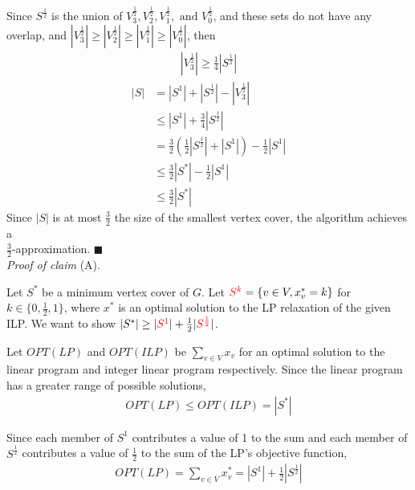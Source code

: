\documentclass{article}
\begin{document}
\begin{enumerate}
\begin{enumerate}
        Since $S^{\frac{1}{2}}$ is the union of $V_3^{\frac{1}{2}}, V_2^{\frac{1}{2}}, V_1^{\frac{1}{2}}, \text{ and } V_0^{\frac{1}{2}}$, and these sets do not have any overlap, and $|V_3^{\frac{1}{2}}| \geq |V_2^{\frac{1}{2}}| \geq |V_1^{\frac{1}{2}}| \geq |V_0^{\frac{1}{2}}|$, then 
        \begin{align*} 
            |V_3^{\frac{1}{2}}| \geq \frac{1}{4}|S^{\frac{1}{2}}| \tag{B}
        \end{align*}
        \begin{align*}
            |S|&=|S^1|+|S^{\frac{1}{2}}| - |V_3^{\frac{1}{2}}| \tag{by definition of $S$}\\
            & \leq |S^1| + \frac{3}{4}|S^{\frac{1}{2}}| \tag{by (B)}\\
            &= \frac{3}{2} (\frac{1}{2} |S^{\frac{1}{2}}| + |S^1|) - \frac{1}{2} |S^1|\\
            & \leq \frac{3}{2} |S^*| - \frac{1}{2} |S^1| \tag{by claim (A)}\\
            & \leq \frac{3}{2} |S^*|
        \end{align*}
        Since $|S|$ is at most $\frac{3}{2}$ the size of the smallest vertex cover, the algorithm achieves a \\ $\frac{3}{2}$-approximation. \hfill $\blacksquare$
        \\
        
        \emph{{\color{blue}Proof of claim}} {\color{blue}(A)}. 
        
        Let $S^*$ be a minimum vertex cover of $G$. Let ${\color{red}S^k}= \{v \in V, x^*_v=k\}$ for $k \in \{0, \frac{1}{2}, 1\}$, where $x^*$ is an optimal solution to the LP relaxation of the given ILP. We want to show $|S^*| \geq |{\color{red}S^1}| + \frac{1}{2}|{\color{red}S^{\frac{1}{2}}}|$. 
        
        Let $OPT(LP)$ and $OPT(ILP)$ be $\sum_{v \in V} x_v$ for an optimal solution to the linear program and integer linear program respectively. Since the linear program has a greater range of possible solutions,
        \begin{align*}
            OPT(LP) \leq OPT(ILP) = |S^*| \tag{C}
        \end{align*}
        
        Since each member of $S^1$ contributes a value of 1 to the sum and each member of $S^{\frac{1}{2}}$ contributes a value of $\frac{1}{2}$ to the sum of the LP's objective function, 
        \begin{align*}
            OPT(LP) = \sum_{v \in V}x^*_v = |S^1| + \frac{1}{2}|S^{\frac{1}{2}}| \tag{D}
        \end{align*}
         

\end{enumerate}
\end{enumerate}
\end{document}
